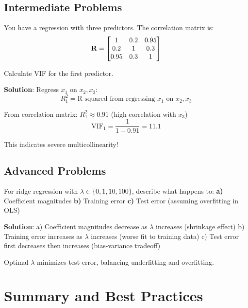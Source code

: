 \documentclass{article}
\newcounter{exercise}
\begin{document}
\subsection{Intermediate Problems}

\begin{tcolorbox}[colback=gray!5!white,colframe=gray!75!black,title=Problem \stepcounter{exercise}\#\theexercise: Multicollinearity Analysis]

You have a regression with three predictors. The correlation matrix is:
$$\mathbf{R} = \begin{bmatrix} 1 & 0.2 & 0.95 \\ 0.2 & 1 & 0.3 \\ 0.95 & 0.3 & 1 \end{bmatrix}$$

Calculate VIF for the first predictor.

\textbf{Solution}:
Regress $x_1$ on $x_2, x_3$:
$$R_1^2 = \text{R-squared from regressing } x_1 \text{ on } x_2, x_3$$

From correlation matrix: $R_1^2 \approx 0.91$ (high correlation with $x_3$)
$$\text{VIF}_1 = \frac{1}{1-0.91} = 11.1$$

This indicates severe multicollinearity!
\end{tcolorbox}

\subsection{Advanced Problems}

\begin{tcolorbox}[colback=gray!5!white,colframe=gray!75!black,title=Problem \stepcounter{exercise}\#\theexercise: Ridge Regression Path]

For ridge regression with $\lambda \in \{0, 1, 10, 100\}$, describe what happens to:
\textbf{a)} Coefficient magnitudes
\textbf{b)} Training error
\textbf{c)} Test error (assuming overfitting in OLS)

\textbf{Solution}:
a) Coefficient magnitudes decrease as $\lambda$ increases (shrinkage effect)
b) Training error increases as $\lambda$ increases (worse fit to training data)
c) Test error first decreases then increases (bias-variance tradeoff)

Optimal $\lambda$ minimizes test error, balancing underfitting and overfitting.
\end{tcolorbox}

\section{Summary and Best Practices}
\end{document}

